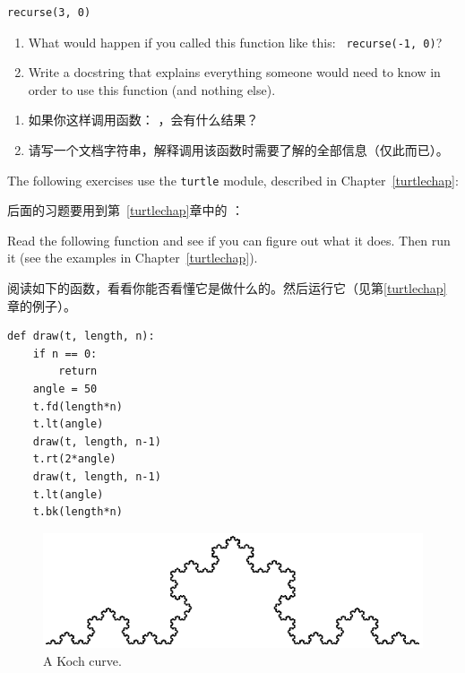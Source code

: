 {{{{\begin{exercise}
\begin{lstlisting}
recurse(3, 0)
\end{lstlisting}

\begin{enumerate}

\item What would happen if you called this function like this: {\tt
  recurse(-1, 0)}?

\item Write a docstring that explains everything someone would need to
  know in order to use this function (and nothing else).

\end{enumerate}

\begin{enumerate}

\item 如果你这样调用函数：  ，会有什么结果？

\item 请写一个文档字符串，解释调用该函数时需要了解的全部信息（仅此而已）。

\end{enumerate}

\end{exercise}

The following exercises use the {\tt turtle} module, described in
Chapter~\ref{turtlechap}:

后面的习题要用到第~\ref{turtlechap}章中的 ：

\begin{exercise}

Read the following function and see if you can figure out
what it does.  Then run it (see the examples in Chapter~\ref{turtlechap}).

阅读如下的函数，看看你能否看懂它是做什么的。然后运行它（见第\ref{turtlechap}章的例子）。

\begin{lstlisting}
def draw(t, length, n):
    if n == 0:
        return
    angle = 50
    t.fd(length*n)
    t.lt(angle)
    draw(t, length, n-1)
    t.rt(2*angle)
    draw(t, length, n-1)
    t.lt(angle)
    t.bk(length*n)
\end{lstlisting}

\end{exercise}


\begin{figure}
\centerline
{\includegraphics[scale=0.8]{../source/figs/koch.pdf}}
\caption{A Koch curve.}
\label{fig.koch}
\end{figure}


}}}}
